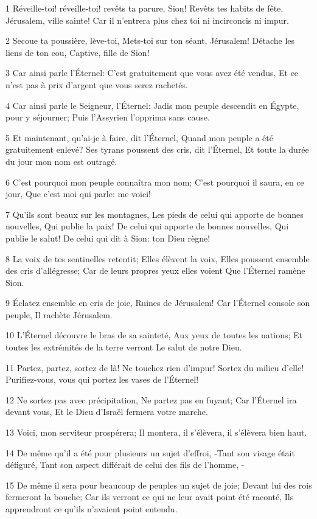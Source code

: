 \par 1 Réveille-toi! réveille-toi! revêts ta parure, Sion! Revêts tes habits de fête, Jérusalem, ville sainte! Car il n'entrera plus chez toi ni incirconcis ni impur.
\par 2 Secoue ta poussière, lève-toi, Mets-toi sur ton séant, Jérusalem! Détache les liens de ton cou, Captive, fille de Sion!
\par 3 Car ainsi parle l'Éternel: C'est gratuitement que vous avez été vendus, Et ce n'est pas à prix d'argent que vous serez rachetés.
\par 4 Car ainsi parle le Seigneur, l'Éternel: Jadis mon peuple descendit en Égypte, pour y séjourner; Puis l'Assyrien l'opprima sans cause.
\par 5 Et maintenant, qu'ai-je à faire, dit l'Éternel, Quand mon peuple a été gratuitement enlevé? Ses tyrans poussent des cris, dit l'Éternel, Et toute la durée du jour mon nom est outragé.
\par 6 C'est pourquoi mon peuple connaîtra mon nom; C'est pourquoi il saura, en ce jour, Que c'est moi qui parle: me voici!
\par 7 Qu'ils sont beaux sur les montagnes, Les pieds de celui qui apporte de bonnes nouvelles, Qui publie la paix! De celui qui apporte de bonnes nouvelles, Qui publie le salut! De celui qui dit à Sion: ton Dieu règne!
\par 8 La voix de tes sentinelles retentit; Elles élèvent la voix, Elles poussent ensemble des cris d'allégresse; Car de leurs propres yeux elles voient Que l'Éternel ramène Sion.
\par 9 Éclatez ensemble en cris de joie, Ruines de Jérusalem! Car l'Éternel console son peuple, Il rachète Jérusalem.
\par 10 L'Éternel découvre le bras de sa sainteté, Aux yeux de toutes les nations; Et toutes les extrémités de la terre verront Le salut de notre Dieu.
\par 11 Partez, partez, sortez de là! Ne touchez rien d'impur! Sortez du milieu d'elle! Purifiez-vous, vous qui portez les vases de l'Éternel!
\par 12 Ne sortez pas avec précipitation, Ne partez pas en fuyant; Car l'Éternel ira devant vous, Et le Dieu d'Israël fermera votre marche.
\par 13 Voici, mon serviteur prospérera; Il montera, il s'élèvera, il s'élèvera bien haut.
\par 14 De même qu'il a été pour plusieurs un sujet d'effroi, -Tant son visage était défiguré, Tant son aspect différait de celui des fils de l'homme, -
\par 15 De même il sera pour beaucoup de peuples un sujet de joie; Devant lui des rois fermeront la bouche; Car ils verront ce qui ne leur avait point été raconté, Ils apprendront ce qu'ils n'avaient point entendu.

